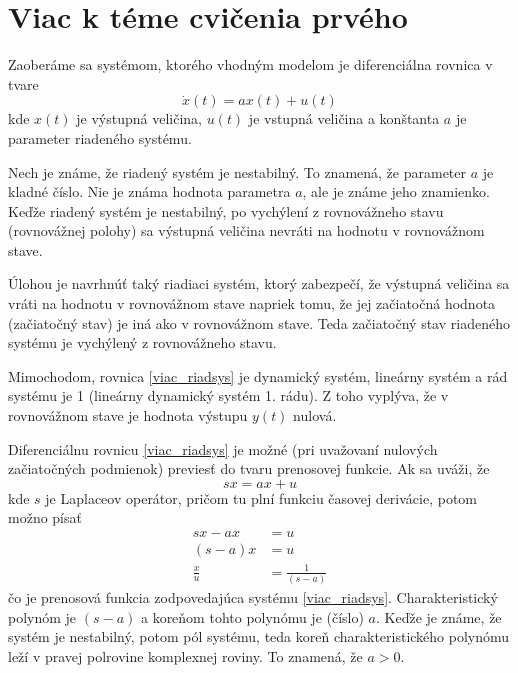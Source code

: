 \documentclass[a4paper, 10pt, ]{article}
\begin{document}
\section{Viac k téme cvičenia prvého}

Zaoberáme sa systémom, ktorého vhodným modelom je diferenciálna rovnica v tvare
\begin{equation} \label{viac_riadsys}
	\dot x(t) = a x(t) + u(t)
\end{equation}
kde $x(t)$ je výstupná veličina, $u(t)$ je vstupná veličina a konštanta $a$ je parameter riadeného systému.

Nech je známe, že riadený systém je nestabilný. To znamená, že parameter $a$ je kladné číslo. Nie je známa hodnota parametra $a$, ale je známe jeho znamienko. Keďže riadený systém je nestabilný, po vychýlení z rovnovážneho stavu (rovnovážnej polohy) sa výstupná veličina nevráti na hodnotu v rovnovážnom stave.

Úlohou je navrhnúť taký riadiaci systém, ktorý zabezpečí, že výstupná veličina sa vráti na hodnotu v rovnovážnom stave napriek tomu, že jej začiatočná hodnota (začiatočný stav) je iná ako v rovnovážnom stave. Teda začiatočný stav riadeného systému je vychýlený z rovnovážneho stavu.



\bigskip

\noindent
Mimochodom, rovnica \eqref{viac_riadsys} je dynamický systém, lineárny systém a rád systému je 1 (lineárny dynamický systém 1. rádu). Z toho vyplýva, že v rovnovážnom stave je hodnota výstupu $y(t)$ nulová.

Diferenciálnu rovnicu \eqref{viac_riadsys} je možné (pri uvažovaní nulových začiatočných podmienok) previesť do tvaru prenosovej funkcie. Ak sa uváži, že
\begin{equation}
	s x = a x + u
\end{equation}
kde $s$ je Laplaceov operátor, pričom tu plní funkciu časovej derivácie, potom možno písať
\begin{subequations}
	\begin{align}
		s x - a x &= u \\
		\left( s - a \right) x &= u \\
		\frac{x}{u} &= \frac{1}{\left( s - a \right)}
	\end{align}
\end{subequations}
čo je prenosová funkcia zodpovedajúca systému \eqref{viac_riadsys}. Charakteristický polynóm je $\left( s - a \right)$ a koreňom tohto polynómu je (číslo) $a$. Keďže je známe, že systém je nestabilný, potom pól systému, teda koreň charakteristického polynómu leží v pravej polrovine komplexnej roviny. To znamená, že $a>0$.
\end{document}

